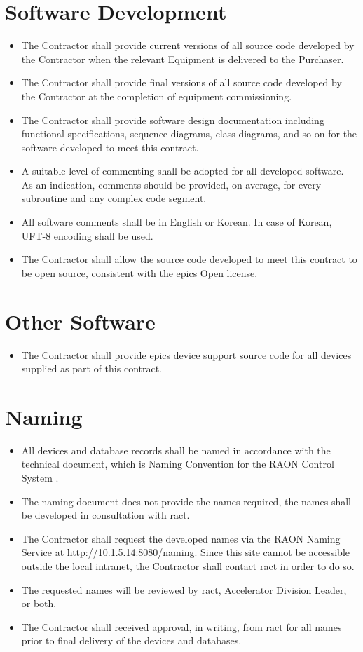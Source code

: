\documentclass[11pt
  , a4paper
  , article
  , oneside
]{memoir}
\begin{document}
\section{Software Development}
\begin{itemize}
\item The Contractor shall provide current versions of all source code developed by the Contractor when the relevant Equipment is delivered to the Purchaser.
\item The Contractor shall provide final versions of all source code developed by the Contractor at the completion of equipment commissioning.
\item The Contractor shall provide software design documentation including functional specifications, sequence diagrams, class diagrams, and so on for the software developed to meet this contract.
\item A suitable level of commenting shall be adopted for all developed software. As an indication, comments should be provided, on average, for every subroutine and any complex code segment.
\item All software comments shall be in English or Korean. In case of Korean, UFT-8 encoding shall be used.
\item The Contractor shall allow the source code developed to meet this contract to be open source, consistent with the \Gls{epics} Open license.  
\end{itemize}

\section{Other Software}
\begin{itemize}
  \item The Contractor shall provide \Gls{epics} device support source code for all devices supplied as part of this contract.
\end{itemize}


\section{Naming}
\begin{itemize}
  \item All devices and database records shall be named in accordance with the technical document, which is Naming Convention for the RAON Control System \cite{raon-naming-convention}.
  \item The naming document \cite{raon-naming-convention} does not provide the names required, the names shall be developed in consultation with \Gls{ract}. 
  \item The Contractor shall request the developed names via the RAON Naming Service at \url{http://10.1.5.14:8080/naming}. Since this site cannot be accessible outside the local intranet, the Contractor shall contact \Gls{ract} in order to do so.
  \item The requested names will be reviewed by \Gls{ract}, Accelerator Division Leader, or both. 
  \item The Contractor shall received approval, in writing, from \Gls{ract} for all names prior to final delivery of the devices and databases. 
\end{itemize}
\end{document}

